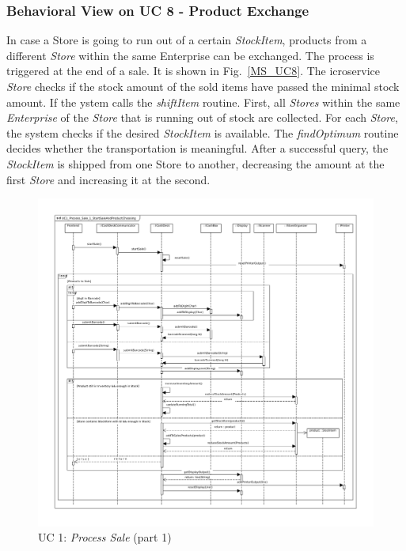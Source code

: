 		\subsubsection*{Behavioral View on UC 8 - Product Exchange}
		In case a Store is going to run out of a certain \textit{StockItem}, products from a different \textit{Store} within the same Enterprise can be exchanged. 
		The process is triggered at the end of a sale. 
		It is shown in  Fig.~\ref{MS_UC8}. 
		The icroservice \textit{Store} checks if the stock amount of the sold items have passed the minimal stock amount. 
		If  the ystem calls the \textit{shiftItem} routine. 
		First, all \textit{Stores} within the same \textit{Enterprise} of the \textit{Store} that is running out of stock are collected.
		For each \textit{Store}, the system checks if the desired \textit{StockItem} is available. 
		The \textit{findOptimum} routine decides whether the transportation is meaningful. 
		After a successful query, the \textit{StockItem} is shipped from one Store to another, decreasing the amount at the first \textit{Store} and increasing it at the second.

		
			\begin{figure}[!h]
				\centering
				\includegraphics[width = 1\textwidth]{img/UC1_Process_Sale_1_StartSaleAndProductChoosing.pdf}
				\caption{UC 1: \textit{Process Sale} (part 1)}
				\label{MS_UC1_1}
			\end{figure}
			
